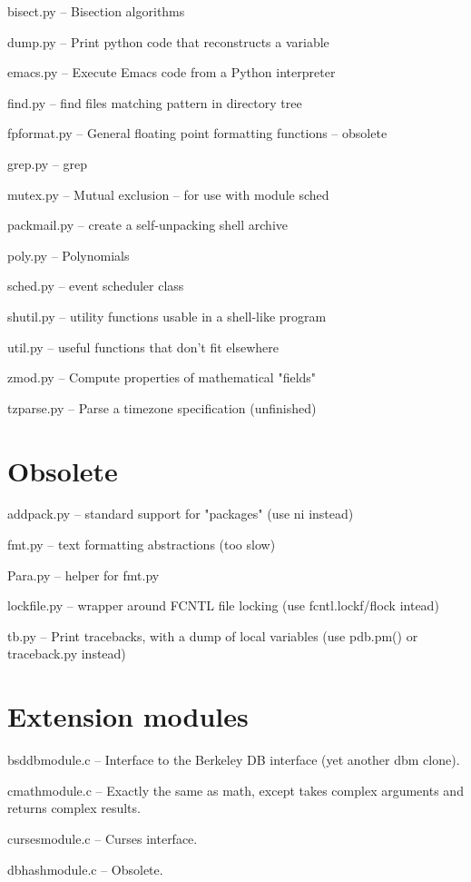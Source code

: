 bisect.py -- Bisection algorithms

dump.py -- Print python code that reconstructs a variable

emacs.py -- Execute Emacs code from a Python interpreter

find.py -- find files matching pattern in directory tree

fpformat.py -- General floating point formatting functions -- obsolete

grep.py -- grep

mutex.py -- Mutual exclusion -- for use with module sched

packmail.py -- create a self-unpacking \Unix{} shell archive

poly.py -- Polynomials

sched.py -- event scheduler class

shutil.py -- utility functions usable in a shell-like program

util.py -- useful functions that don't fit elsewhere

zmod.py -- Compute properties of mathematical "fields"

tzparse.py -- Parse a timezone specification (unfinished)


\section{Obsolete}

addpack.py -- standard support for "packages" (use ni instead)

fmt.py -- text formatting abstractions (too slow)

Para.py -- helper for fmt.py

lockfile.py -- wrapper around FCNTL file locking (use
fcntl.lockf/flock intead)

tb.py -- Print tracebacks, with a dump of local variables (use
pdb.pm() or traceback.py instead)


\section{Extension modules}

bsddbmodule.c -- Interface to the Berkeley DB interface (yet another
dbm clone).

cmathmodule.c -- Exactly the same as math, except takes complex
arguments and returns complex results.

cursesmodule.c -- Curses interface.

dbhashmodule.c -- Obsolete.

